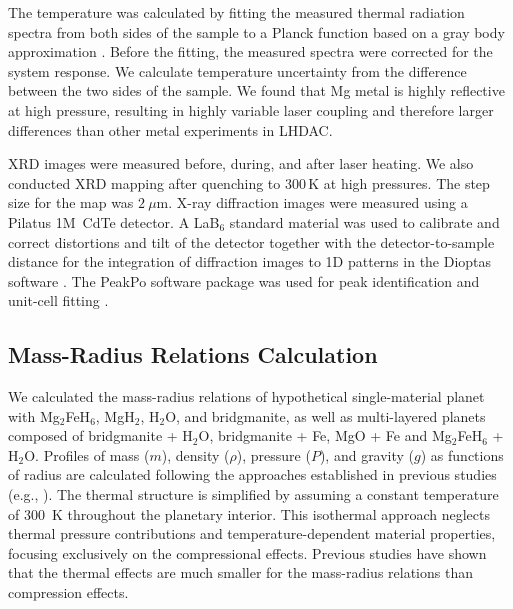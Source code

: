 \documentclass[draft,jgrga,12pt]{agujournal2019}
\begin{document}
The temperature was calculated by fitting the measured thermal radiation spectra from both sides of the sample to a Planck function based on a gray body approximation \cite{prakapenka_advanced_2008}. 
Before the fitting, the measured spectra were corrected for the system response.
We calculate temperature uncertainty from the difference between the two sides of the sample. 
We found that Mg metal is highly reflective at high pressure, resulting in highly variable laser coupling and therefore larger differences than other metal experiments in LHDAC\@.

XRD images were measured before, during, and after laser heating. 
We also conducted XRD mapping after quenching to 300\,K at high pressures. %
The step size for the map was $2~\mu\mathrm{m}$.
X-ray diffraction images were measured using a Pilatus 1M~CdTe detector. 
A LaB$_6$ standard material was used to calibrate and correct distortions and tilt of the detector together with the detector-to-sample distance for the integration of diffraction images to 1D patterns in the Dioptas software \cite{prescher_dioptas_2015}. 
The PeakPo software package was used for peak identification and unit-cell fitting \cite{shim_shdshim_2018}.

\subsection{Mass-Radius Relations Calculation}

We calculated the mass-radius relations of hypothetical single-material planet with Mg$_2$FeH$_6$, MgH$_2$, H$_2$O, and bridgmanite, as well as multi-layered planets composed of bridgmanite + H$_2$O, bridgmanite + Fe, MgO + Fe and Mg$_2$FeH$_6$ + H$_2$O. 
Profiles of mass ($m$), density ($\rho$), pressure ($P$), and gravity ($g$) as functions of radius are calculated following the approaches established in previous studies (e.g., ).
The thermal structure is simplified by assuming a constant temperature of 300~K throughout the planetary interior. 
This isothermal approach neglects thermal pressure contributions and temperature-dependent material properties, focusing exclusively on the compressional effects.
Previous studies \cite{zeng_new_2021, zeng_detailed_2013} have shown that the thermal effects are much smaller for the mass-radius relations than compression effects.
\end{document}
